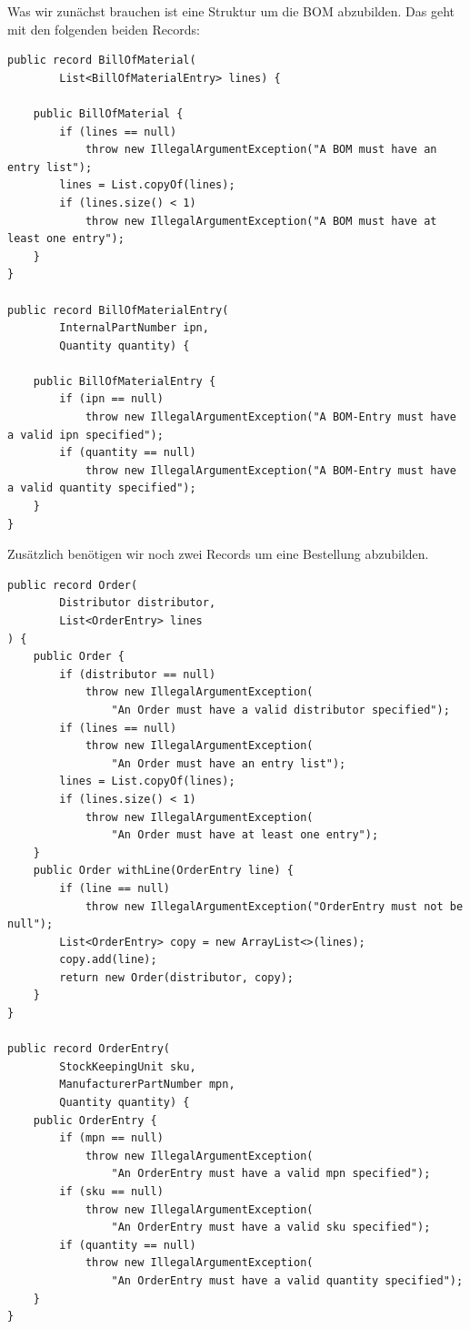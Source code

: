 Was wir zunächst brauchen ist eine Struktur um die BOM abzubilden. Das geht mit
den folgenden beiden Records:

\begin{listing}[H]
\begin{verbatim}
public record BillOfMaterial(
        List<BillOfMaterialEntry> lines) {

    public BillOfMaterial {
        if (lines == null)
            throw new IllegalArgumentException("A BOM must have an entry list");
        lines = List.copyOf(lines);
        if (lines.size() < 1)
            throw new IllegalArgumentException("A BOM must have at least one entry");
    }
}

public record BillOfMaterialEntry(
        InternalPartNumber ipn,
        Quantity quantity) {

    public BillOfMaterialEntry {
        if (ipn == null)
            throw new IllegalArgumentException("A BOM-Entry must have a valid ipn specified");
        if (quantity == null)
            throw new IllegalArgumentException("A BOM-Entry must have a valid quantity specified");
    }
}
\end{verbatim}
\caption{Zwei Records um BOMs abzubilden.}
\label{lst:billOfMaterial}
\end{listing}

Zusätzlich benötigen wir noch zwei Records um eine Bestellung abzubilden.

\begin{listing}[H]
\begin{verbatim}
public record Order(
        Distributor distributor,
        List<OrderEntry> lines
) {
    public Order {
        if (distributor == null)
            throw new IllegalArgumentException(
                "An Order must have a valid distributor specified");
        if (lines == null)
            throw new IllegalArgumentException(
                "An Order must have an entry list");
        lines = List.copyOf(lines);
        if (lines.size() < 1)
            throw new IllegalArgumentException(
                "An Order must have at least one entry");
    }
    public Order withLine(OrderEntry line) {
        if (line == null)
            throw new IllegalArgumentException("OrderEntry must not be null");
        List<OrderEntry> copy = new ArrayList<>(lines);
        copy.add(line);
        return new Order(distributor, copy);
    }
}

public record OrderEntry(
        StockKeepingUnit sku,
        ManufacturerPartNumber mpn,
        Quantity quantity) {
    public OrderEntry {
        if (mpn == null)
            throw new IllegalArgumentException(
                "An OrderEntry must have a valid mpn specified");
        if (sku == null)
            throw new IllegalArgumentException(
                "An OrderEntry must have a valid sku specified");
        if (quantity == null)
            throw new IllegalArgumentException(
                "An OrderEntry must have a valid quantity specified");
    }
}
\end{verbatim}
\caption{Zwei Records um Bestellungen abzubilden.}
\label{lst:OrderRecords}
\end{listing}

